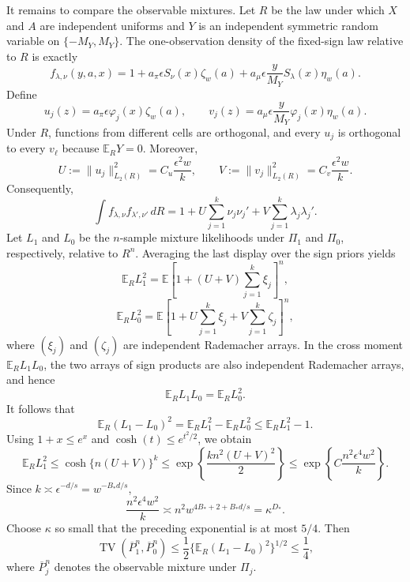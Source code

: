 It remains to compare the observable mixtures. Let \(R\) be the law under which \(X\) and \(A\) are independent uniforms and \(Y\) is an independent symmetric random variable on \(\{-M_Y,M_Y\}\). The one-observation density of the fixed-sign law relative to \(R\) is exactly
\[
f_{\lambda,\nu}(y,a,x)
=
1+a_\pi\epsilon S_\nu(x)\zeta_w(a)
+a_\mu\epsilon\frac{y}{M_Y}S_\lambda(x)\eta_w(a).
\]
Define
\[
u_j(z)=a_\pi\epsilon\varphi_j(x)\zeta_w(a),
\qquad
v_j(z)=a_\mu\epsilon\frac{y}{M_Y}\varphi_j(x)\eta_w(a).
\]
Under \(R\), functions from different cells are orthogonal, and every \(u_j\) is orthogonal to every \(v_\ell\) because \(\mathbb E_RY=0\). Moreover,
\[
U:=\lVert u_j\rVert_{L_2(R)}^2=C_u\frac{\epsilon^2w}{k},
\qquad
V:=\lVert v_j\rVert_{L_2(R)}^2=C_v\frac{\epsilon^2w}{k}.
\]
Consequently,
\[
\int f_{\lambda,\nu}f_{\lambda',\nu'}\,dR
=
1+U\sum_{j=1}^k\nu_j\nu_j'
+V\sum_{j=1}^k\lambda_j\lambda_j'.
\]
Let \(L_1\) and \(L_0\) be the \(n\)-sample mixture likelihoods under \(\Pi_1\) and \(\Pi_0\), respectively, relative to \(R^n\). Averaging the last display over the sign priors yields
\[
\mathbb E_RL_1^2
=
\mathbb E\left[1+(U+V)\sum_{j=1}^k\xi_j\right]^n,
\]
\[
\mathbb E_RL_0^2
=
\mathbb E\left[1+U\sum_{j=1}^k\xi_j+V\sum_{j=1}^k\zeta_j\right]^n,
\]
where \((\xi_j)\) and \((\zeta_j)\) are independent Rademacher arrays. In the cross moment \(\mathbb E_RL_1L_0\), the two arrays of sign products are also independent Rademacher arrays, and hence
\[
\mathbb E_RL_1L_0=\mathbb E_RL_0^2.
\]
It follows that
\[
\mathbb E_R(L_1-L_0)^2
=
\mathbb E_RL_1^2-\mathbb E_RL_0^2
\le
\mathbb E_RL_1^2-1.
\]
Using \(1+x\le e^x\) and \(\cosh(t)\le e^{t^2/2}\), we obtain
\[
\mathbb E_RL_1^2
\le
\cosh\{n(U+V)\}^k
\le
\exp\left\{\frac{k n^2(U+V)^2}{2}\right\}
\le
\exp\left\{C\frac{n^2\epsilon^4w^2}{k}\right\}.
\]
Since \(k\asymp\epsilon^{-d/s}=w^{-B_*d/s}\),
\[
\frac{n^2\epsilon^4w^2}{k}
\asymp
n^2w^{4B_*+2+B_*d/s}
=
\kappa^{D_*}.
\]
Choose \(\kappa\) so small that the preceding exponential is at most \(5/4\). Then
\[
\operatorname{TV}(\overline P_1^n,\overline P_0^n)
\le
\frac12\{\mathbb E_R(L_1-L_0)^2\}^{1/2}
\le\frac14,
\]
where \(\overline P_j^n\) denotes the observable mixture under \(\Pi_j\).

